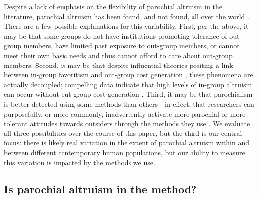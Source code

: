 \documentclass[bibauthoryear]{aa}
\begin{document}
Despite a lack of emphasis on the flexibility of parochial altruism in the literature, parochial altruism has been found, and not found, all over the world \citep{Rusch2014, Baldassarri1183}. There are a few possible explanations for this variability. First, per the above, it may be that some groups do not have institutions promoting tolerance of out-group members, have limited past exposure to out-group members, or cannot meet their own basic needs and thus cannot afford to care about out-group members. Second, it may be that despite influential theories positing a link between in-group favoritism and out-group cost generation \citep{bowles2003origins}, these phenomena are actually decoupled; compelling data indicate that high levels of in-group altruism can occur without out-group cost generation \citep{purzycki2019identity, hruschka2013economic, yamagishi2016parochial, brewer2006evolutionary, schaub2017threat, cashdan2001ethnocentrism, Rusch2014}. Third, it may be that parochialism is better detected using some methods than others---in effect, that researchers can purposefully, or more commonly, inadvertently activate more parochial or more tolerant attitudes towards outsiders through the methods they use \citep{Pisor2020}. We evaluate all three possibilities over the course of this paper, but the third is our central focus: there is likely real variation in the extent of parochial altruism within and between different contemporary human populations, but our ability to measure this variation is impacted by the methods we use.

\subsection{Is parochial altruism in the method?}\label{inthemethod}
\end{document}
